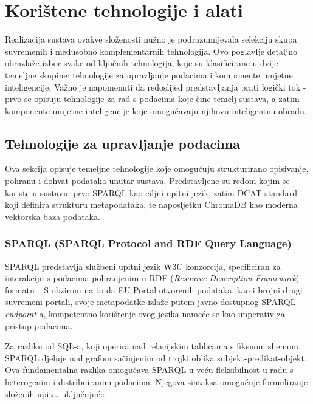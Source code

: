 \chapter{Korištene tehnologije i alati}
\label{ch:technologies}


Realizacija sustava ovakve složenosti nužno je podrazumijevala selekciju skupa suvremenih i međusobno komplementarnih tehnologija. Ovo poglavlje detaljno obrazlaže izbor svake od ključnih tehnologija, koje su klasificirane u dvije temeljne skupine: tehnologije za upravljanje podacima i komponente umjetne inteligencije. Važno je napomenuti da redoslijed predstavljanja prati logički tok - prvo se opisuju tehnologije za rad s podacima koje čine temelj sustava, a zatim komponente umjetne inteligencije koje omogućavaju njihovu inteligentnu obradu.

\section{Tehnologije za upravljanje podacima}

Ova sekcija opisuje temeljne tehnologije koje omogućuju strukturirano opisivanje, pohranu i dohvat podataka unutar sustava. Predstavljene su redom kojim se koriste u sustavu: prvo SPARQL kao ciljni upitni jezik, zatim DCAT standard koji definira strukturu metapodataka, te naposljetku ChromaDB kao moderna vektorska baza podataka.

\subsection{SPARQL (SPARQL Protocol and RDF Query Language)}

SPARQL predstavlja službeni upitni jezik W3C konzorcija, specificiran za interakciju s podacima pohranjenim u RDF (\textit{Resource Description Framework}) formatu~\cite{sparql2013}. S obzirom na to da EU Portal otvorenih podataka, kao i brojni drugi suvremeni portali, svoje metapodatke izlaže putem javno dostupnog SPARQL \textit{endpoint}-a, kompetentno korištenje ovog jezika nameće se kao imperativ za pristup podacima.

Za razliku od SQL-a, koji operira nad relacijskim tablicama s fiksnom shemom, SPARQL djeluje nad grafom sačinjenim od trojki oblika subjekt-predikat-objekt. Ova fundamentalna razlika omogućava SPARQL-u veću fleksibilnost u radu s heterogenim i distribuiranim podacima. Njegova sintaksa omogućuje formuliranje složenih upita, uključujući:

